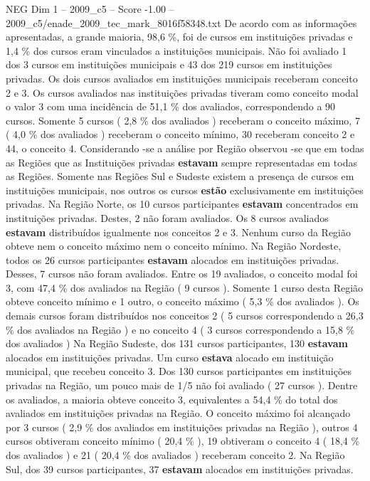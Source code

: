 \begin{textsample}{NEG Dim 1 – 2009\_c5 – Score -1.00 – 2009\_c5/enade\_2009\_tec\_mark\_8016f58348.txt}
De acordo com as informações apresentadas, a grande maioria, 98,6 \%, foi de cursos em instituições privadas e 1,4 \% dos cursos eram vinculados a instituições municipais.
Não foi avaliado 1 dos 3 cursos em instituições municipais e 43 dos 219 cursos em instituições privadas.
Os dois cursos avaliados em instituições municipais receberam conceito 2 e 3.
Os cursos avaliados nas instituições privadas tiveram como conceito modal o valor 3 com uma incidência de 51,1 \% dos avaliados, correspondendo a 90 cursos.
Somente 5 cursos ( 2,8 \% dos avaliados ) receberam o conceito máximo, 7 ( 4,0 \% dos avaliados ) receberam o conceito mínimo, 30 receberam conceito 2 e 44, o conceito 4.
Considerando -se a análise por Região observou -se que em todas as Regiões que as Instituições privadas \textbf{estavam} sempre representadas em todas as Regiões.
Somente nas Regiões Sul e Sudeste existem a presença de cursos em instituições municipais, nos outros os cursos \textbf{estão} exclusivamente em instituições privadas.
Na Região Norte, os 10 cursos participantes \textbf{estavam} concentrados em instituições privadas.
Destes, 2 não foram avaliados.
Os 8 cursos avaliados \textbf{estavam} distribuídos igualmente nos conceitos 2 e 3.
Nenhum curso da Região obteve nem o conceito máximo nem o conceito mínimo.
Na Região Nordeste, todos os 26 cursos participantes \textbf{estavam} alocados em instituições privadas.
Desses, 7 cursos não foram avaliados.
Entre os 19 avaliados, o conceito modal foi 3, com 47,4 \% dos avaliados na Região ( 9 cursos ).
Somente 1 curso desta Região obteve conceito mínimo e 1 outro, o conceito máximo ( 5,3 \% dos avaliados ).
Os demais cursos foram distribuídos nos conceitos 2 ( 5 cursos correspondendo a 26,3 \% dos avaliados na Região ) e no conceito 4 ( 3 cursos correspondendo a 15,8 \% dos avaliados ) Na Região Sudeste, dos 131 cursos participantes, 130 \textbf{estavam} alocados em instituições privadas.
Um curso \textbf{estava} alocado em instituição municipal, que recebeu conceito 3.
Dos 130 cursos participantes em instituições privadas na Região, um pouco mais de 1/5 não foi avaliado ( 27 cursos ).
Dentre os avaliados, a maioria obteve conceito 3, equivalentes a 54,4 \% do total dos avaliados em instituições privadas na Região.
O conceito máximo foi alcançado por 3 cursos ( 2,9 \% dos avaliados em instituições privadas na Região ), outros 4 cursos obtiveram conceito mínimo ( 20,4 \% ), 19 obtiveram o conceito 4 ( 18,4 \% dos avaliados ) e 21 ( 20,4 \% dos avaliados ) receberam conceito 2.
Na Região Sul, dos 39 cursos participantes, 37 \textbf{estavam} alocados em instituições privadas.

\end{textsample}
